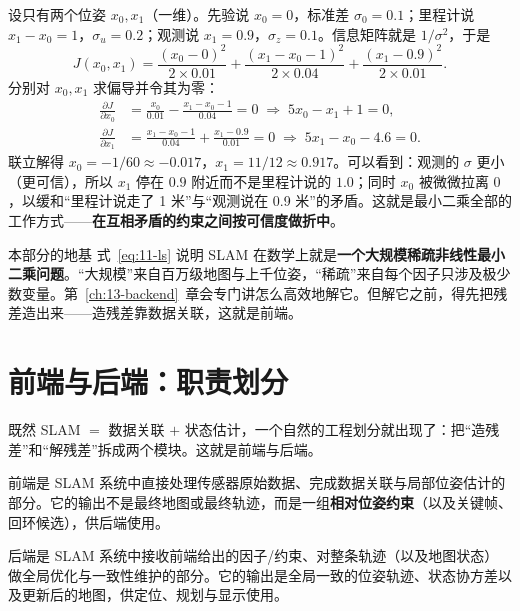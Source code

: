 \begin{example}
设只有两个位姿 $x_0,x_1$（一维）。先验说 $x_0=0$，标准差 $\sigma_0=0.1$；里程计说 $x_1-x_0=1$，$\sigma_u=0.2$；观测说 $x_1=0.9$，$\sigma_z=0.1$。信息矩阵就是 $1/\sigma^2$，于是
\begin{equation}
J(x_0,x_1)=\frac{(x_0-0)^2}{2\times 0.01}+\frac{(x_1-x_0-1)^2}{2\times 0.04}+\frac{(x_1-0.9)^2}{2\times 0.01}.
\end{equation}
分别对 $x_0,x_1$ 求偏导并令其为零：
\begin{align}
\frac{\partial J}{\partial x_0} &= \frac{x_0}{0.01}-\frac{x_1-x_0-1}{0.04}=0
  \;\Longrightarrow\; 5x_0-x_1+1=0,\\
\frac{\partial J}{\partial x_1} &= \frac{x_1-x_0-1}{0.04}+\frac{x_1-0.9}{0.01}=0
  \;\Longrightarrow\; 5x_1-x_0-4.6=0.
\end{align}
联立解得 $x_0=-1/60\approx-0.017$，$x_1=11/12\approx0.917$。可以看到：观测的 $\sigma$ 更小（更可信），所以 $x_1$ 停在 $0.9$ 附近而不是里程计说的 $1.0$；同时 $x_0$ 被微微拉离 $0$，以缓和``里程计说走了 1 米''与``观测说在 0.9 米''的矛盾。这就是最小二乘全部的工作方式——\textbf{在互相矛盾的约束之间按可信度做折中}。
\end{example}

\begin{keybox}{本部分的地基}
式~\eqref{eq:11-ls} 说明 SLAM 在数学上就是\textbf{一个大规模稀疏非线性最小二乘问题}。``大规模''来自百万级地图与上千位姿，``稀疏''来自每个因子只涉及极少数变量。第~\ref{ch:13-backend}~章会专门讲怎么高效地解它。但解它之前，得先把残差造出来——造残差靠数据关联，这就是前端。
\end{keybox}

\section{前端与后端：职责划分}\label{sec:11-fe-be}

既然 SLAM $=$ 数据关联 $+$ 状态估计，一个自然的工程划分就出现了：把``造残差''和``解残差''拆成两个模块。这就是前端与后端。

\begin{definition}
前端是 SLAM 系统中直接处理传感器原始数据、完成数据关联与局部位姿估计的部分。它的输出不是最终地图或最终轨迹，而是一组\textbf{相对位姿约束}（以及关键帧、回环候选），供后端使用。
\end{definition}

\begin{definition}
后端是 SLAM 系统中接收前端给出的因子/约束、对整条轨迹（以及地图状态）做全局优化与一致性维护的部分。它的输出是全局一致的位姿轨迹、状态协方差以及更新后的地图，供定位、规划与显示使用。
\end{definition}

